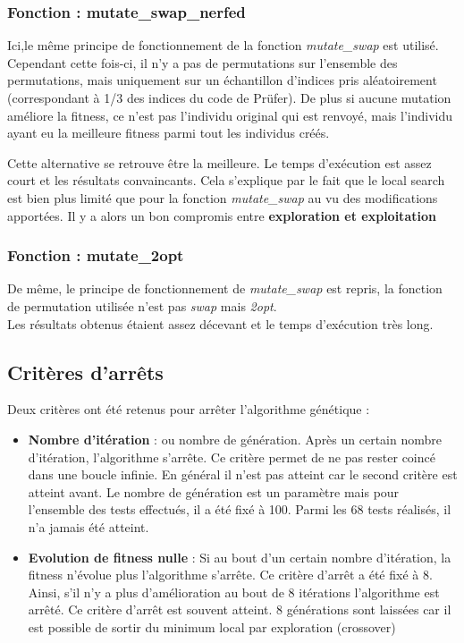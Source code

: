 \documentclass{article} %
\begin{document}
\subsubsection{Fonction : mutate\_swap\_nerfed \\}
Ici,le même principe de fonctionnement de la fonction \textit{mutate\_swap} est utilisé. Cependant cette fois-ci, il n'y a pas de permutations sur l'ensemble des permutations, mais uniquement sur un échantillon d'indices pris aléatoirement (correspondant à 1/3 des indices du code de Prüfer). De plus si aucune mutation améliore la fitness, ce n'est pas l'individu original qui est renvoyé, mais l'individu ayant eu la meilleure fitness parmi tout les individus créés.


Cette alternative se retrouve être la meilleure. Le temps d'exécution est assez court et les résultats convaincants. Cela s'explique par le fait que le local search est bien plus limité que pour la fonction \textit{mutate\_swap} au vu des modifications apportées. Il y a alors un bon compromis entre \textbf{exploration et exploitation}

\subsubsection{Fonction : mutate\_2opt\\}
De même, le principe de fonctionnement de \textit{mutate\_swap} est repris, la fonction de permutation utilisée n'est pas \textit{swap} mais \textit{2opt}.\\
Les résultats obtenus étaient assez décevant et le temps d'exécution très long.

\subsection{Critères d'arrêts}
Deux critères ont été retenus pour arrêter l'algorithme génétique :
\begin{itemize}
	\item \textbf{Nombre d'itération} : ou nombre de génération. Après un certain nombre d'itération, l'algorithme s'arrête. Ce critère permet de ne pas rester coincé dans une boucle infinie. En général il n'est pas atteint car le second critère est atteint avant. Le nombre de génération est un paramètre mais pour l'ensemble des tests effectués, il a été fixé à 100. Parmi les 68 tests réalisés, il n'a jamais été atteint.
	\item \textbf{Evolution de fitness nulle} : Si au bout d'un certain nombre d'itération, la fitness n'évolue plus l'algorithme s'arrête. Ce critère d'arrêt a été fixé à 8. Ainsi, s'il n'y a plus d'amélioration au bout de 8 itérations l'algorithme est arrêté. Ce critère d'arrêt est souvent atteint. 8 générations sont laissées car il est possible de sortir du minimum local par exploration (crossover)
\end{itemize}
\newpage
\end{document}
